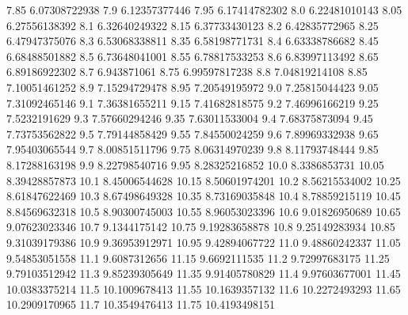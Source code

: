            7.85    6.07308722938
            7.9    6.12357377446
           7.95    6.17414782302
            8.0    6.22481010143
           8.05    6.27556138392
            8.1    6.32640249322
           8.15    6.37733430123
            8.2    6.42835772965
           8.25    6.47947375076
            8.3    6.53068338811
           8.35    6.58198771731
            8.4    6.63338786682
           8.45    6.68488501882
            8.5    6.73648041001
           8.55    6.78817533253
            8.6    6.83997113492
           8.65    6.89186922302
            8.7      6.943871061
           8.75    6.99597817238
            8.8    7.04819214108
           8.85    7.10051461252
            8.9    7.15294729478
           8.95    7.20549195972
            9.0    7.25815044423
           9.05    7.31092465146
            9.1    7.36381655211
           9.15    7.41682818575
            9.2    7.46996166219
           9.25     7.5232191629
            9.3    7.57660294246
           9.35    7.63011533004
            9.4    7.68375873094
           9.45    7.73753562822
            9.5    7.79144858429
           9.55    7.84550024259
            9.6    7.89969332938
           9.65    7.95403065544
            9.7    8.00851511796
           9.75    8.06314970239
            9.8    8.11793748444
           9.85    8.17288163198
            9.9    8.22798540716
           9.95    8.28325216852
           10.0     8.3386853731
          10.05    8.39428857873
           10.1    8.45006544628
          10.15    8.50601974201
           10.2    8.56215534002
          10.25    8.61847622469
           10.3    8.67498649328
          10.35    8.73169035848
           10.4    8.78859215119
          10.45    8.84569632318
           10.5    8.90300745003
          10.55    8.96053023396
           10.6    9.01826950689
          10.65    9.07623023346
           10.7     9.1344175142
          10.75    9.19283658878
           10.8    9.25149283934
          10.85    9.31039179386
           10.9    9.36953912971
          10.95    9.42894067722
           11.0    9.48860242337
          11.05    9.54853051558
           11.1     9.6087312656
          11.15     9.6692111535
           11.2    9.72997683175
          11.25    9.79103512942
           11.3    9.85239305649
          11.35    9.91405780829
           11.4    9.97603677001
          11.45    10.0383375214
           11.5    10.1009678413
          11.55    10.1639357132
           11.6    10.2272493293
          11.65    10.2909170965
           11.7    10.3549476413
          11.75    10.4193498151
